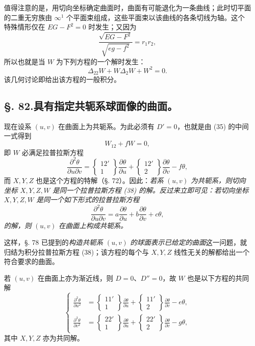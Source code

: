值得注意的是，用切向坐标确定曲面时，曲面有可能退化为一条曲线；此时切平面的二重无穷族由 \(\infty^1\) 个平面束组成，这些平面束以该曲线的各条切线为轴。这个特殊情形仅在 \(EG-F^2=0\) 时发生；又因为
\[
 \frac{\sqrt{EG-F^2}}{\sqrt{eg-f^2}}=r_1r_2,
\]
所以也就是当 \(W\) 为下列方程的一个解时发生：
\[
 \Delta_{22}W+W\Delta_2W+W^2=0.
\]
该几何讨论即给出该方程的一般积分。

\subsection*{\S. 82.\quad 具有指定共轭系球面像的曲面。}

现在设系 \((u,v)\) 在曲面上为共轭系。为此必须有 \(D'=0\)，也就是由 (35) 的中间一式得到
\[
 W_{12}+fW=0,
\]
即 \(W\) 必满足拉普拉斯方程
\begin{equation}\tag{38}
 \frac{\partial^2\theta}{\partial u\partial v}=\left\{\begin{matrix}12'\\1\end{matrix}\right\}\frac{\partial\theta}{\partial u}+\left\{\begin{matrix}12'\\2\end{matrix}\right\}\frac{\partial\theta}{\partial v}-f\theta,
\end{equation}
而 \(X,Y,Z\) 也是这个方程的特解（\S. 72）。因此：\emph{若系 \((u,v)\) 为共轭系，则切向坐标 \(X,Y,Z,W\) 是同一个拉普拉斯方程 (38) 的解。反过来立即可见：若切向坐标 \(X,Y,Z,W\) 是同一个如下形式的拉普拉斯方程}
\[
 \frac{\partial^2\theta}{\partial u\partial v}=a\frac{\partial\theta}{\partial u}+b\frac{\partial\theta}{\partial v}+c\theta,
\]
\emph{的解，则 \((u,v)\) 在曲面上构成共轭系。}

这样，\S. 78 已提到的\emph{构造共轭系 \((u,v)\) 的球面表示已给定的曲面}这一问题，就归结为积分拉普拉斯方程 (38)；该方程的每个与 \(X,Y,Z\) 线性无关的解都给出一个符合要求的曲面。

若 \((u,v)\) 在曲面上亦为渐近线，则 \(D=0\)、\(D''=0\)，故 \(W\) 也是以下方程的共同解
\[
\left\{\begin{aligned}
 \frac{\partial^2\theta}{\partial u^2}&=\left\{\begin{matrix}11'\\1\end{matrix}\right\}\frac{\partial\theta}{\partial u}+\left\{\begin{matrix}11'\\2\end{matrix}\right\}\frac{\partial\theta}{\partial v}-e\theta,\\
 \frac{\partial^2\theta}{\partial v^2}&=\left\{\begin{matrix}22'\\1\end{matrix}\right\}\frac{\partial\theta}{\partial u}+\left\{\begin{matrix}22'\\2\end{matrix}\right\}\frac{\partial\theta}{\partial v}-g\theta,
\end{aligned}\right.
\]
其中 \(X,Y,Z\) 亦为共同解。


